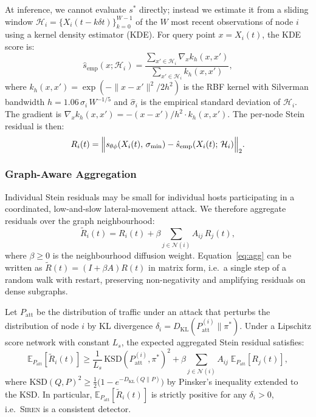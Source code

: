 At inference, we cannot evaluate $s^*$ directly; instead we estimate it from
a sliding window $\mathcal{H}_i = \{X_i(t-k\delta t)\}_{k=0}^{W-1}$ of the
$W$ most recent observations of node $i$ using a kernel density estimator
(KDE).
For query point $x = X_i(t)$, the KDE score is:
\begin{equation}\label{eq:kde}
\hat{s}_{\mathrm{emp}}(x; \mathcal{H}_i)
= \frac{\sum_{x' \in \mathcal{H}_i} \nabla_x k_h(x, x')}
       {\sum_{x' \in \mathcal{H}_i} k_h(x, x')},
\end{equation}
where $k_h(x, x') = \exp(-\|x - x'\|^2 / 2h^2)$ is the RBF kernel with
Silverman bandwidth $h = 1.06\,\hat{\sigma}_i\, W^{-1/5}$
and $\hat{\sigma}_i$ is the empirical standard deviation of $\mathcal{H}_i$.
The gradient is $\nabla_x k_h(x, x') = -(x - x')/h^2 \cdot k_h(x, x')$.
The per-node Stein residual is then:
\begin{equation}\label{eq:stein_res}
R_i(t)
= \Bigl\| s_{\theta\phi}(X_i(t),\, \sigma_{\min})
         - \hat{s}_{\mathrm{emp}}(X_i(t);\, \mathcal{H}_i)
  \Bigr\|_2.
\end{equation}

\subsubsection{Graph-Aware Aggregation}

Individual Stein residuals may be small for individual hosts participating in
a coordinated, low-and-slow lateral-movement attack.
We therefore aggregate residuals over the graph neighbourhood:
\begin{equation}\label{eq:agg}
\tilde{R}_i(t)
= R_i(t) + \beta \sum_{j \in \mathcal{N}(i)} A_{ij}\, R_j(t),
\end{equation}
where $\beta \ge 0$ is the neighbourhood diffusion weight.
Equation~\eqref{eq:agg} can be written as $\tilde{R}(t) = (I + \beta A) R(t)$
in matrix form, i.e.\ a single step of a random walk with restart, preserving
non-negativity and amplifying residuals on dense subgraphs.

\begin{theorem}
\label{thm:power}
Let $P_{\mathrm{att}}$ be the distribution of traffic under an attack that
perturbs the distribution of node $i$ by KL divergence
$\delta_i = D_{\mathrm{KL}}(P_{\mathrm{att}}^{(i)} \| \pi^*)$.
Under a Lipschitz score network with constant $L_s$, the expected aggregated
Stein residual satisfies:
\begin{equation}\label{eq:power}
\mathbb{E}_{P_{\mathrm{att}}}\!\left[\tilde{R}_i(t)\right]
\ge \frac{1}{L_s}\,\mathrm{KSD}(P_{\mathrm{att}}^{(i)}, \pi^*)^2
    + \beta \sum_{j \in \mathcal{N}(i)} A_{ij}\;
      \mathbb{E}_{P_{\mathrm{att}}}\!\left[R_j(t)\right],
\end{equation}
where $\mathrm{KSD}(Q, P)^2 \ge \frac{1}{2}\bigl(1 - e^{-D_{\mathrm{KL}}(Q\|P)}\bigr)$
by Pinsker's inequality extended to the KSD.
In particular, $\mathbb{E}_{P_{\mathrm{att}}}[\tilde{R}_i(t)]$ is strictly
positive for any $\delta_i > 0$, i.e.\ \textsc{Siren} is a consistent
detector.
\end{theorem}

